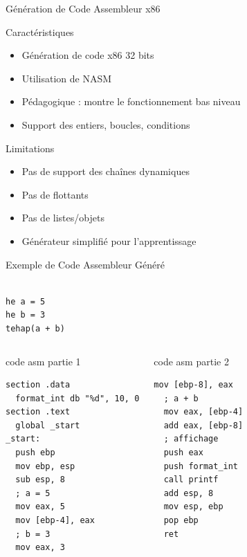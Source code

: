 \documentclass[10pt]{beamer}
\begin{document}
\begin{frame}{Génération de Code Assembleur x86}
    \begin{block}{Caractéristiques}
        \begin{itemize}
            \item Génération de code x86 32 bits
            \item Utilisation de NASM
            \item Pédagogique : montre le fonctionnement bas niveau
            \item Support des entiers, boucles, conditions
        \end{itemize}
    \end{block}
    
    \begin{block}{Limitations}
        \begin{itemize}
            \item Pas de support des chaînes dynamiques
            \item Pas de flottants
            \item Pas de listes/objets
            \item Générateur simplifié pour l'apprentissage
        \end{itemize}
    \end{block}
\end{frame}

\begin{frame}[fragile]{Exemple de Code Assembleur Généré}
    \begin{lstlisting}[style=algi-style]
        
he a = 5
he b = 3
tehap(a + b)
\end{lstlisting}
    \begin{columns}[T]
\begin{block}{code asm partie 1}
    \begin{lstlisting}[style=algi-style]
section .data
  format_int db "%d", 10, 0
section .text
  global _start
_start:
  push ebp
  mov ebp, esp
  sub esp, 8
  ; a = 5
  mov eax, 5
  mov [ebp-4], eax
  ; b = 3
  mov eax, 3
\end{lstlisting}
\end{block}
\begin{block}{code asm partie 2}
    \begin{lstlisting}[style=algi-style]
  mov [ebp-8], eax
  ; a + b
  mov eax, [ebp-4]
  add eax, [ebp-8]
  ; affichage
  push eax
  push format_int
  call printf
  add esp, 8
  mov esp, ebp
  pop ebp
  ret
\end{lstlisting}
\end{block}
\end{columns}
\end{frame}
\end{document}
